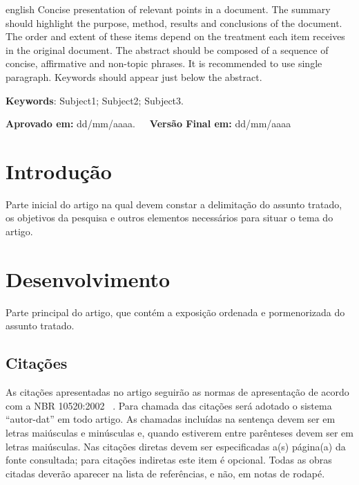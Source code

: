 \documentclass[article,a4paper,12pt,brazil,sumario=tradicional]{abntex2}
\begin{document}
\vspace{-.3cm}
\begin{hyphenrules}{english}
\noindent Concise presentation of relevant points in a document. The summary should highlight the purpose, method, results and conclusions of the document. The order and extent of these items depend on the treatment each item receives in the original document. The abstract should be composed of a sequence of concise, affirmative and non-topic phrases. It is recommended to use single paragraph. Keywords should appear just below the abstract.
\end{hyphenrules}
\vspace{.4cm}
 
\noindent \textbf{Keywords}: Subject1; Subject2; Subject3.

\vspace{.4cm}

\noindent \textbf{Aprovado em:} dd/mm/aaaa.~~~\textbf{Versão Final em:} dd/mm/aaaa

\section{Introdução}

Parte inicial do artigo na qual devem constar a delimitação do assunto tratado, os objetivos da pesquisa e outros elementos necessários para situar o tema do artigo. 

\section{Desenvolvimento}

Parte principal do artigo, que contém a exposição ordenada e pormenorizada do assunto tratado. 

\subsection{Citações}

As citações apresentadas no artigo seguirão as normas de apresentação de acordo com a NBR 10520:2002 ~\cite{bibliografica6023}. Para chamada das citações será adotado o sistema ``autor-dat'' em todo artigo. As chamadas incluídas na sentença devem ser em letras maiúsculas e minúsculas e, quando estiverem entre parênteses devem ser em letras maiúsculas. Nas citações diretas devem ser especificadas a(s) página(a) da fonte consultada; para citações indiretas este item é opcional. Todas as obras citadas deverão aparecer na lista de referências, e não, em notas de rodapé.
\end{document}
